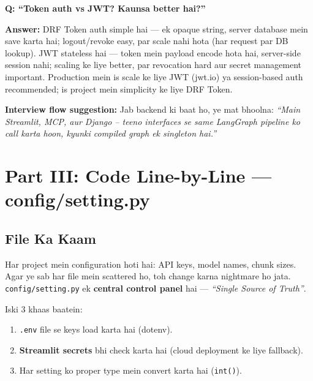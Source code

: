 \documentclass[11pt, a4paper]{article}
\begin{document}
\begin{interviewbox}
\textbf{Q: ``Token auth vs JWT? Kaunsa better hai?''}

\textbf{Answer:} DRF Token auth simple hai --- ek opaque string, server database mein save karta hai; logout/revoke easy, par scale nahi hota (har request par DB lookup). JWT stateless hai --- token mein payload encode hota hai, server-side session nahi; scaling ke liye better, par revocation hard aur secret management important. Production mein is scale ke liye JWT (jwt.io) ya session-based auth recommended; is project mein simplicity ke liye DRF Token.
\end{interviewbox}

\begin{notebox}
\textbf{Interview flow suggestion:} Jab backend ki baat ho, ye mat bhoolna: \textit{``Main Streamlit, MCP, aur Django -- teeno interfaces se same LangGraph pipeline ko call karta hoon, kyunki compiled graph ek singleton hai.''}
\end{notebox}

\newpage

\section{Part III: Code Line-by-Line --- config/setting.py}

\subsection{File Ka Kaam}

\begin{storybox}
Har project mein configuration hoti hai: API keys, model names, chunk sizes. Agar ye sab har file mein scattered ho, toh change karna nightmare ho jata. \texttt{config/setting.py} ek \textbf{central control panel} hai --- \textit{``Single Source of Truth''}.

Iski 3 khaas baatein:
\begin{enumerate}[label=\textcolor{accentpurple}{\arabic*.}]
\item \texttt{.env} file se keys load karta hai (dotenv).
\item \textbf{Streamlit secrets} bhi check karta hai (cloud deployment ke liye fallback).
\item Har setting ko proper type mein convert karta hai (\texttt{int()}).
\end{enumerate}
\end{storybox}
\end{document}
